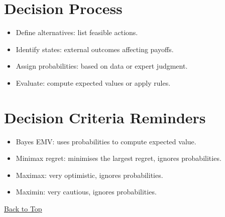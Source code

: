 \section{Decision Process}\label{sec:decision-process}

\begin{itemize}
	\item Define alternatives: list feasible actions.
	\item Identify states: external outcomes affecting payoffs.
	\item Assign probabilities: based on data or expert judgment.
	\item Evaluate: compute expected values or apply rules.
\end{itemize}

\section{Decision Criteria Reminders}\label{sec:decision-criteria-reminders}

\begin{itemize}
	\item Bayes EMV: uses probabilities to compute expected value.
	\item Minimax regret: minimises the largest regret, ignores probabilities.
	\item Maximax: very optimistic, ignores probabilities.
	\item Maximin: very cautious, ignores probabilities.
\end{itemize}

\vspace{6pt}
\noindent\hyperref[table-of-contents]{Back to Top}
